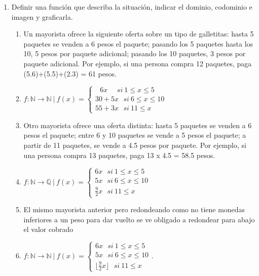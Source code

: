 \documentclass[a4paper]{article}
\newcommand{\answer}{\item[**]}
\newcommand{\exercise}{\item}
\begin{document}
\begin{enumerate}
\begin{enumerate} [label=(\alph*)]
		\item Cada ciudad de la Argentina con la provincia de la que es capital.
		\answer No cumple la condición de existencia. Hay ciudades que no son capitales de ninguna provincia.

	\end{enumerate}

	\exercise Definir una función que describa la situación, indicar el dominio, codominio e imagen y graficarla.
	\begin{enumerate} [label=(\alph*)]
		\item Un mayorista ofrece la siguiente oferta sobre un tipo de galletitas: hasta 5 paquetes se venden a 6 pesos el paquete; pasando los 5 paquetes hasta los 10, 5 pesos por paquete adicional; pasando los 10 paquetes, 3 pesos por paquete adicional. Por ejemplo, si una persona compra 12 paquetes, paga (5.6)+(5.5)+(2.3) = 61 pesos.
		\answer $f: \mathbb{N} \to \mathbb{N} ~|~ f(x)=\left\{\begin{matrix}~~~6x~~~ ~~~si~ 1\leq x\leq 5 \\30+5x ~~~si~ 6\leq x\leq 10 \\55+3x ~~~si~ 11\leq x~~~~\end{matrix}\right.$

		\item Otro mayorista ofrece una oferta distinta: hasta 5 paquetes se venden a 6 pesos el paquete; entre 6 y 10 paquetes se vende a 5 pesos el paquete; a partir de 11 		paquetes, se vende a 4.5 pesos por paquete. Por ejemplo, si una persona compra 13 paquetes, paga 13 x 4.5 = 58.5 pesos.
		\answer $f: \mathbb{N} \to \mathbb{Q} ~|~ f(x)=\left\{\begin{matrix}6x ~~~si~ 1\leq x\leq 5 \\5x ~~~si~ 6\leq x\leq 10 \\\frac{9}{2}x ~~~si~ 11\leq x~~~~\end{matrix}\right.$

		\item El mismo mayorista anterior pero redondeando como no tiene monedas inferiores a un peso para dar vuelto se ve obligado a redondear para abajo el valor cobrado
		\answer $f: \mathbb{N} \to \mathbb{N} ~|~ f(x)=\left\{\begin{matrix}6x ~~~si~ 1\leq x\leq 5 \\5x ~~~si~ 6\leq x\leq 10 \\ \lfloor\frac{9}{2}x\rfloor ~~~si~ 11\leq x~~~~\end{matrix}\right.$.


\end{enumerate}
\end{enumerate}
\end{document}
